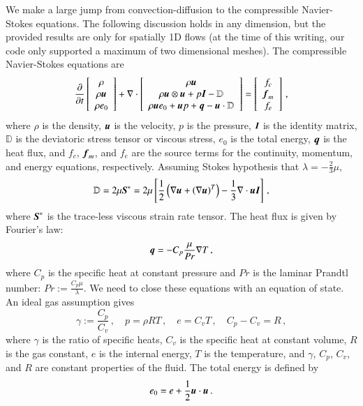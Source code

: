 \documentclass[preprint,12pt]{elsarticle}
\begin{document}
We make a large jump from convection-diffusion to the compressible Navier-Stokes equations.
The following discussion holds in any dimension, but the provided results are only for spatially 1D flows 
(at the time of this writing, our code only supported a maximum of two dimensional meshes).
The compressible Navier-Stokes equations are
\begin{align}
\frac{\partial}{\partial t}\left[ \begin{array}{c} \rho\\ \rho\boldsymbol u\\ \rho e_0\\ \end{array} \right]
+\nabla\cdot\left[ \begin{array}{c} \rho\boldsymbol u\\ \rho\boldsymbol u\otimes\boldsymbol u+p\boldsymbol I-\mathbb{D}\\ \rho\boldsymbol u e_0+\boldsymbol u p+\boldsymbol q-\boldsymbol u\cdot\mathbb{D}\\ \end{array} \right]
=\left[ \begin{array}{c} f_c\\ \boldsymbol f_m\\ f_e\\ \end{array} \right]\,,
\end{align}
where $\rho$ is the density, $\boldsymbol u$ is the velocity, $p$ is the pressure, $\boldsymbol I$ is the identity matrix,
$\mathbb{D}$ is the deviatoric stress tensor or viscous stress, $e_0$ is the total energy, $\boldsymbol q$ is the heat flux, 
and $f_c$, $\boldsymbol f_m$, and $f_e$ are the source terms for the continuity, momentum, and energy equations, respectively.
Assuming Stokes hypothesis that $\lambda=-\frac{2}{3}\mu$, 
\begin{equation*}
	\mathbb{D}=2\mu\boldsymbol S^*=2\mu\left[ \frac{1}{2}\left( \nabla\boldsymbol u+\left( \nabla\boldsymbol u \right)^T \right)-\frac{1}{3}\nabla\cdot\boldsymbol u\boldsymbol I \right]\,,
\end{equation*}
where $\boldsymbol S^*$ is the trace-less viscous strain rate tensor.
The heat flux is given by Fourier's law:
\begin{equation*}
	\boldsymbol q=-C_p\frac{\mu}{Pr}\nabla T\,,
\end{equation*}
where $C_p$ is the specific heat at constant pressure and $Pr$ is the laminar Prandtl number: $Pr:=\frac{C_p\mu}{\lambda}$.
We need to close these equations with an equation of state. An ideal gas assumption gives
\begin{equation*}
	\gamma:=\frac{C_p}{C_v}\,,\quad p=\rho RT\,,\quad e=C_v T\,,\quad C_p-C_v=R\,,
\end{equation*}
where $\gamma$ is the ratio of specific heats, $C_v$ is the specific heat at constant volume, $R$ is the gas constant,
$e$ is the internal energy, $T$ is the temperature,
and $\gamma$, $C_p$, $C_v$, and $R$ are constant properties of the fluid.
The total energy is defined by
\begin{equation*}
	e_0=e+\frac{1}{2}\boldsymbol u\cdot\boldsymbol u\,.
\end{equation*}
\end{document}
